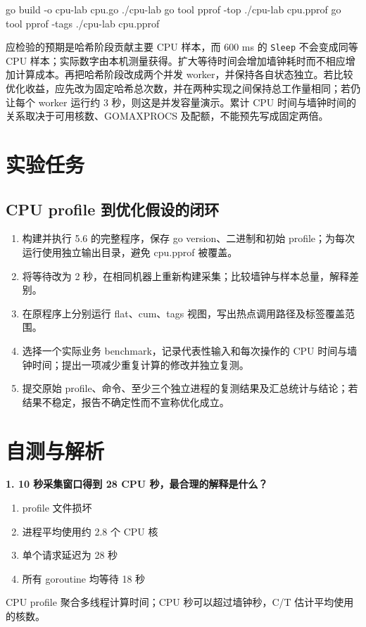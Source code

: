 \documentclass[UTF8,fontset=fandol,openany,11pt]{ctexbook}
\begin{document}
\begin{codeblock}
go build -o cpu-lab cpu.go
./cpu-lab
go tool pprof -top ./cpu-lab cpu.pprof
go tool pprof -tags ./cpu-lab cpu.pprof
\end{codeblock}

应检验的预期是哈希阶段贡献主要 CPU 样本，而 600 ms 的 \texttt{Sleep} 不会变成同等 CPU 样本；实际数字由本机测量获得。扩大等待时间会增加墙钟耗时而不相应增加计算成本。再把哈希阶段改成两个并发 worker，并保持各自状态独立。若比较优化收益，应先改为固定哈希总次数，并在两种实现之间保持总工作量相同；若仍让每个 worker 运行约 3 秒，则这是并发容量演示。累计 CPU 时间与墙钟时间的关系取决于可用核数、GOMAXPROCS 及配额，不能预先写成固定两倍。

\section{实验任务}
\subsection*{CPU profile 到优化假设的闭环}
\begin{enumerate}
\item 构建并执行 5.6 的完整程序，保存 go version、二进制和初始 profile；为每次运行使用独立输出目录，避免 cpu.pprof 被覆盖。

\item 将等待改为 2 秒，在相同机器上重新构建采集；比较墙钟与样本总量，解释差别。

\item 在原程序上分别运行 flat、cum、tags 视图，写出热点调用路径及标签覆盖范围。

\item 选择一个实际业务 benchmark，记录代表性输入和每次操作的 CPU 时间与墙钟时间；提出一项减少重复计算的修改并独立复测。

\item 提交原始 profile、命令、至少三个独立进程的复测结果及汇总统计与结论；若结果不稳定，报告不确定性而不宣称优化成立。

\end{enumerate}
\section{自测与解析}
\noindent\textbf{1. 10 秒采集窗口得到 28 CPU 秒，最合理的解释是什么？}
\begin{enumerate}[label=\Alph*.]
\item profile 文件损坏
\item 进程平均使用约 2.8 个 CPU 核
\item 单个请求延迟为 28 秒
\item 所有 goroutine 均等待 18 秒
\end{enumerate}
CPU profile 聚合多线程计算时间；CPU 秒可以超过墙钟秒，C/T 估计平均使用的核数。
\end{document}
